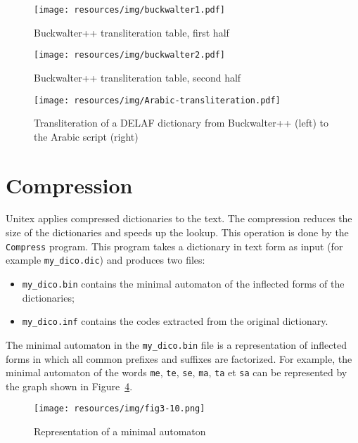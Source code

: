 \begin{figure}[!p]
\centering
\texttt{[image: resources/img/buckwalter1.pdf]}
\caption{Buckwalter++ transliteration table, first half\label{buckwalter1}}
\end{figure}

\begin{figure}[!p]
\begin{center}
\texttt{[image: resources/img/buckwalter2.pdf]}
\caption{Buckwalter++ transliteration table, second half\label{buckwalter2}}
\end{center}
\end{figure}

\begin{figure}[!ht]
\begin{center}
\texttt{[image: resources/img/Arabic-transliteration.pdf]}
\caption{Transliteration of a DELAF
dictionary from Buckwalter++ (left) to the Arabic script (right)\label{Arabic-transliteration}}
\end{center}
\end{figure}



\section{Compression}

Unitex applies compressed dictionaries to the text. The compression reduces the
size of the dictionaries and speeds up the lookup. This operation is done by the
\verb+Compress+ program. This program takes a dictionary in text form 
as input (for example \verb+my_dico.dic+) and produces two files:

\begin{itemize}
  \item \verb+my_dico.bin+ contains the minimal automaton of the inflected forms of the dictionaries;
  \item \verb+my_dico.inf+ contains the codes extracted from the original dictionary.
\end{itemize}

\noindent The minimal automaton in the \verb+my_dico.bin+ file is a
representation of inflected forms in which all common prefixes and suffixes are factorized. For
example, the minimal automaton of the words \verb+me+, \verb+te+, \verb+se+,
\verb+ma+, \verb+ta+ et \verb+sa+ can be represented by the graph shown in
Figure~\ref{fig-example-minimal-automaton}.
\begin{figure}[!ht]
\begin{center}
\texttt{[image: resources/img/fig3-10.png]}
\caption{Representation of a minimal
automaton\label{fig-example-minimal-automaton}}
\end{center}
\end{figure}

